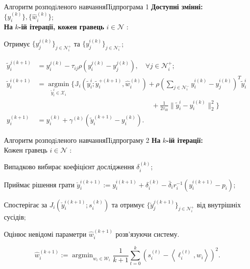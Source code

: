 \documentclass[unicode]{beamer}
\begin{document}
\begin{frame}{Алгоритм розподiленого навчання}{Підпрограма 1}
\textbf{Доступні змінні:} $\{y_{i}^{(k)}\},\{\hat{w}_{i}^{(k)}\}$;\\
\textbf{На} $k$\textbf{-ій ітерації, кожен гравець} $i \in \mathcal{N}$ :

Отримує $\{y_{j}^{j(k)}\}_{j \in \mathcal{N}_{i}^{+}}$ та $\{y_{j}^{i(k)}\}_{j \in \mathcal{N}_{i}^{-}}$;

$
\begin{aligned}
\tilde{y}_{i}^{j(k+1)} &=y_{i}^{j(k)}-\tau_{i j} \rho(y_{i}^{j(k)}-y_{j}^{j(k)}), \quad \forall j \in \mathcal{N}_{i}^{+} ; \\
\tilde{y}_{i}^{i(k+1)} &=\underset{\tilde{y}_{i}^{i} \in \mathcal{X}_{i}}{\operatorname{argmin}}\{\mathbb{J}_{i}(\tilde{y}_{i}^{i} ; \tilde{y}_{i}^{+(k+1)}, \hat{w}_{i}^{(k)})+\rho\left(\sum_{j \in \mathcal{N}_{i}^{-}} y_{i}^{i(k)}-y_{j}^{i(k)}\right)^{T} \tilde{y}_{i}^{i}\\
&\hspace{7cm} +\frac{1}{2 \tau_{i 0}}\|\tilde{y}_{i}^{i}-y_{i}^{i(k)}\|_{2}^{2}\} \\
y_{i}^{(k+1)} &=y_{i}^{(k)}+\gamma^{(k)}(\tilde{y}_{i}^{(k+1)}-y_{i}^{(k)}) .
\end{aligned}
$\\
\end{frame}

\begin{frame}{Алгоритм розподiленого навчання}{Пiдпрограму 2}
\noindent\textbf{На} $k$\textbf{-ій ітерації:}\\
Кожен гравець $i \in \mathcal{N}$ :

Випадково вибирає коефіцієнт дослідження $\delta_{i}^{(k)}$;

Приймає рішення грати $\check{y}_{i}^{i(k+1)}:=y_{i}^{i(k+1)}+\delta_{i}^{(k)}-\bar{\delta}_{i} r_{i}^{-1}(y_{i}^{i(k+1)}-p_{i})$;

Спостерігає за $J_{i}(\check{y}_{i}^{i(k+1)} ; s_{i}^{(k)})$ та отримує $\{\breve{y}_{j}^{j(k+1)}\}_{j \in \mathcal{N}_{i}^{+}}$ від внутрішніх сусідів;

Оцінює невідомі параметри $\hat{w}_{i}^{(k+1)}$ розв'язуючи систему.

\begin{equation*}\label{prog2}
    \hat{w}_{i}^{(k+1)}:=\operatorname{argmin}_{w_{i} \in \mathcal{W}_{i}} \frac{1}{k+1} \sum_{t=0}^{k}\left(s_{i}^{(t)}-\left\langle\ell_{i}^{(t)}, w_{i}\right\rangle\right)^{2} .
\end{equation*}

\end{frame}
\end{document}
